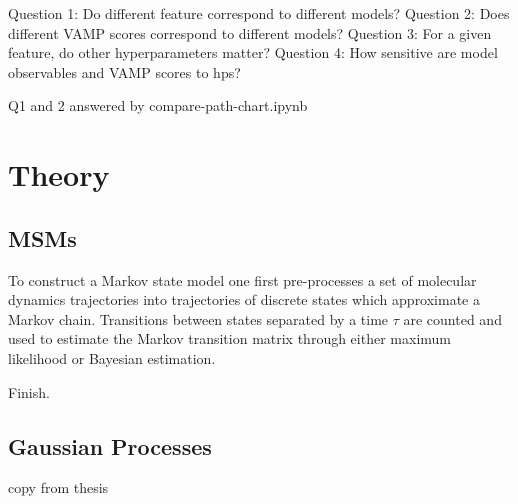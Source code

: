 \documentclass{article}
\begin{document}
Question 1: Do different feature correspond to different models? 
Question 2: Does different VAMP scores correspond to different models? 
Question 3: For a given feature, do other hyperparameters matter? 
Question 4: How sensitive are model observables and VAMP scores to hps? 

Q1 and 2 answered by compare-path-chart.ipynb

\section{Theory}
\subsection{MSMs}
To construct a Markov state model one first pre-processes a set of molecular dynamics trajectories into trajectories of discrete states which approximate a Markov chain. Transitions between states separated by a time $\tau$ are counted and used to estimate the Markov transition matrix through either maximum likelihood or Bayesian estimation.

Finish. 

\subsection{Gaussian Processes}

copy from thesis

\end{document}
